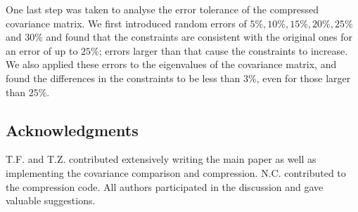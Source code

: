 \documentclass[twocolumn]{\docclass}
\begin{document}
	One last step was taken to analyse the error tolerance of the compressed covariance matrix. We first introduced random errors of $5\%, 10\%, 15\%, 20\%, 25\%$ and $30\%$ and found that the constraints are consistent with the original ones for an error of up to $25\%$; errors larger than that cause the constraints to increase. We also applied these errors to the eigenvalues of the covariance matrix, and found the differences in the constraints to be less than $3\%$, even for those larger than $25\%$.
	
	
	
	\subsection*{Acknowledgments}
	
	
	
	
	 
	
	T.F. and T.Z. contributed extensively writing the main paper as well as implementing the covariance comparison and compression. N.C. contributed to the compression code. All authors participated in the discussion and gave valuable suggestions.
	
	
	
	
	
	
	
	
	
	
	
	
	
	
	
	
\end{document}
